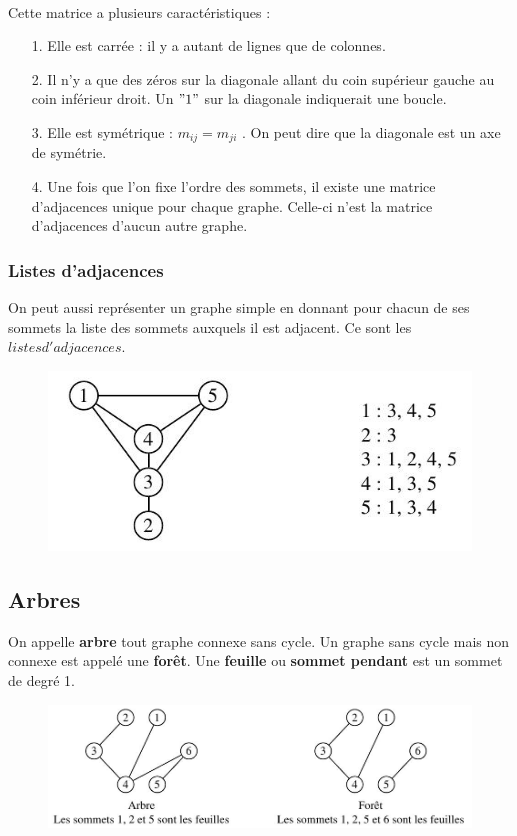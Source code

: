 \paragraph*{}
Cette matrice a plusieurs caractéristiques :

\begin{itemize}
	\item[1.] Elle est carrée : il y a autant de lignes que de colonnes.
	\item[2.] Il n'y a que des zéros sur la diagonale allant du coin supérieur gauche au coin inférieur droit. 
	Un $ "1" $ sur la diagonale indiquerait une boucle.
	\item[3.] Elle est symétrique : $ m_{i j} = m_{ ji} $ . On peut dire que la diagonale est un axe de symétrie.
	\item[4.] Une fois que l'on fixe l'ordre des sommets, il existe une matrice d'adjacences unique
pour chaque graphe. Celle-ci n'est la matrice d'adjacences d'aucun autre graphe.
\end{itemize}
\newpage
\subsubsection{Listes d’adjacences}
\noindent On peut aussi représenter un graphe simple en donnant pour chacun de ses sommets la liste
des sommets auxquels il est adjacent. Ce sont les $ listes d'adjacences $.

\begin{figure}[h]
\centering
\includegraphics[width=0.7\linewidth]{images/graph12}
\label{fig:graph12}
\end{figure}


\subsection{Arbres}
On appelle \textbf{arbre} tout graphe connexe sans cycle. Un graphe sans cycle mais non connexe
est appelé une \textbf{forêt}.
Une \textbf{feuille} ou \textbf{sommet pendant} est un sommet de degré 1.

\begin{figure}[h]
\centering
\includegraphics[width=0.7\linewidth]{images/graph13}
\label{fig:graph13}
\end{figure}

